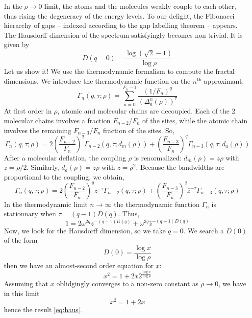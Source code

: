 \documentclass[11pt]{article}
\newcommand{\om}{\ensuremath{\omega}}
\newcommand{\nth}{$n^\text{th}$}
\begin{document}
In the $\rho \rightarrow 0$ limit, the atoms and the molecules weakly couple to each other, thus rising the degeneracy of the energy levels. To our delight, the Fibonacci hierarchy of gaps -- indexed according to the gap labelling theorem -- appears.
The Hausdorff dimension of the spectrum satisfyingly becomes non trivial. It is given by
\begin{equation}
\label{eq:haus}
	D(q=0) = \frac{\log( \sqrt{2} - 1 )}{\log \rho}
\end{equation}
Let us show it! 
We use the thermodynamic formalism to compute the fractal dimensions. We introduce the thermodynamic function on the \nth{} approximant:
\begin{equation}
	\Gamma_n(q,\tau; \rho) = \sum_{a=0}^{F_n-1} \frac{(1/F_n)^q}{(\Delta_a^n(\rho))^\tau}
\end{equation}
At first order in $\rho$, atomic and molecular chains are decoupled. Each of the 2 molecular chains involves a fraction $F_{n-2}/F_n$ of the sites, while the atomic chain involves the remaining $F_{n-3}/F_n$ fraction of the sites. So,
\begin{equation}
	\Gamma_n(q,\tau;\rho) = 2 \left( \frac{F_{n-2}}{F_n} \right)^q \Gamma_{n-2}(q, \tau; d_m(\rho)) + \left( \frac{F_{n-3}}{F_n} \right)^q \Gamma_{n-3}(q,\tau; d_a(\rho))
\end{equation}
After a molecular deflation, the coupling $\rho$ is renormalized: $d_m(\rho) = z \rho$ with $z = \rho/2$. Similarly, $d_a(\rho) = \bar z \rho$ with $\bar z = \rho^2$. 
Because the bandwidths are proportional to the coupling, we obtain,
\begin{equation}
	\Gamma_n(q,\tau;\rho) = 2 \left( \frac{F_{n-2}}{F_n} \right)^q z^{-\tau} \Gamma_{n-2}(q, \tau; \rho) + \left( \frac{F_{n-3}}{F_n} \right)^q \bar{z}^{-\tau} \Gamma_{n-3}(q,\tau; \rho)
\end{equation}
In the thermodynamic limit $n \rightarrow \infty$ the thermodynamic function $\Gamma_n$ is stationnary when $\tau = (q-1) D(q)$. Thus,
\begin{equation}
	1 = 2 \om^{2q} z^{-(q-1)D(q)} + \om^{3q} \bar{z}^{-(q-1) D(q)}
\end{equation}
Now, we look for the Hausdorff dimension, so we take $q=0$. 
We search a $D(0)$ of the form
\begin{equation}
	D(0) = \frac{\log x}{\log \rho}
\end{equation}
then we have an almost-second order equation for $x$:
\begin{equation}
	x^2 = 1 + 2 x 2^{\frac{\log x}{\log \rho}}
\end{equation}
Assuming that $x$ oblidgingly converges to a non-zero constant as $\rho \rightarrow 0$, we have in this limit
\begin{equation}
	x^2 = 1 + 2 x
\end{equation}
hence the result \eqref{eq:haus}.
\end{document}
